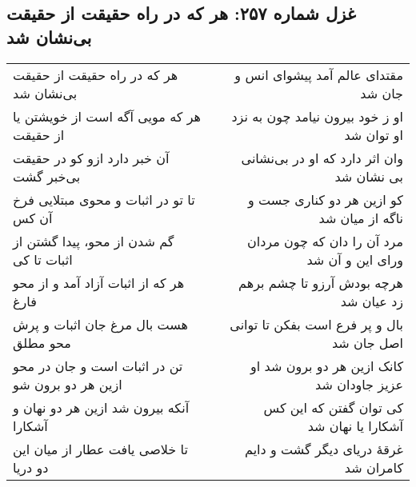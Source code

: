 \begin{center}
\section*{غزل شماره ۲۵۷: هر که در راه حقیقت از حقیقت بی‌نشان شد}
\label{sec:257}
\begin{longtable}{l p{0.5cm} r}
هر که در راه حقیقت از حقیقت بی‌نشان شد
&&
مقتدای عالم آمد پیشوای انس و جان شد
\\
هر که مویی آگه است از خویشتن یا از حقیقت
&&
او ز خود بیرون نیامد چون به نزد او توان شد
\\
آن خبر دارد ازو کو در حقیقت بی‌خبر گشت
&&
وان اثر دارد که او در بی‌نشانی بی نشان شد
\\
تا تو در اثبات و محوی مبتلایی فرخ آن کس
&&
کو ازین هر دو کناری جست و ناگه از میان شد
\\
گم شدن از محو، پیدا گشتن از اثبات تا کی
&&
مرد آن را دان که چون مردان ورای این و آن شد
\\
هر که از اثبات آزاد آمد و از محو فارغ
&&
هرچه بودش آرزو تا چشم برهم زد عیان شد
\\
هست بال مرغ جان اثبات و پرش محو مطلق
&&
بال و پر فرع است بفکن تا توانی اصل جان شد
\\
تن در اثبات است و جان در محو ازین هر دو برون شو
&&
کانک ازین هر دو برون شد او عزیز جاودان شد
\\
آنکه بیرون شد ازین هر دو نهان و آشکارا
&&
کی توان گفتن که این کس آشکارا یا نهان شد
\\
تا خلاصی یافت عطار از میان این دو دریا
&&
غرقهٔ دریای دیگر گشت و دایم کامران شد
\\
\end{longtable}
\end{center}
